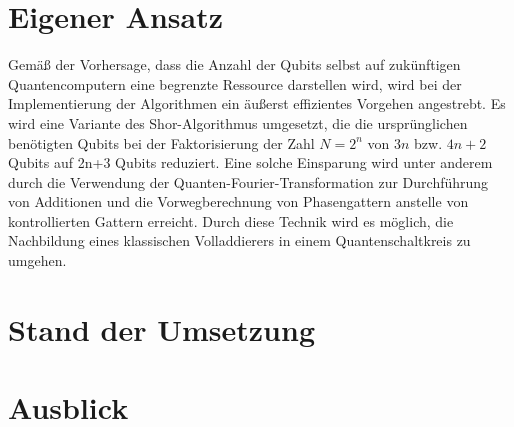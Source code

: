 \documentclass[
	a4paper, %
	10pt, %
	unnumberedsections, %
	twoside, %
]{LTJournalArticle}
\begin{document}
\section{Eigener Ansatz}

Gemäß der Vorhersage, dass die Anzahl der Qubits selbst auf zukünftigen Quantencomputern eine begrenzte Ressource darstellen wird, wird bei der Implementierung der Algorithmen ein äußerst effizientes Vorgehen angestrebt. 
Es wird eine Variante des Shor-Algorithmus umgesetzt, die die ursprünglichen benötigten Qubits bei der Faktorisierung der Zahl $N = 2^{n}$ von $3n$\autocite{zalka1998fast} bzw. $4n+2$\autocite{IBM:Shor_docu} Qubits auf {2n+3} Qubits reduziert\autocite{beauregard2003circuit}. Eine solche Einsparung wird unter anderem durch die Verwendung der Quanten-Fourier-Transformation zur Durchführung von Additionen und die Vorwegberechnung von Phasengattern anstelle von kontrollierten Gattern erreicht. Durch diese Technik wird es möglich, die Nachbildung eines klassischen Volladdierers in einem Quantenschaltkreis zu umgehen\autocite{draper2000addition}.



\section{Stand der Umsetzung}



\section{Ausblick }



\printbibliography %

\end{document}

